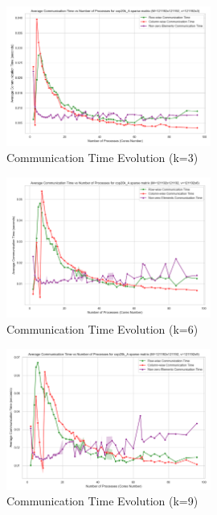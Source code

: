 \documentclass[12pt,oneside]{book} %
\begin{document}
\begin{figure}[H]
    \centering
    \includegraphics[width=0.6\textwidth]{../results/fat_vector_dim/cop20k_A_k3_communication_time.png}
    \caption{Communication Time Evolution (k=3)}\label{fig:cop20k-a-k3-communication-time}
\end{figure}

\begin{figure}[H]
    \centering
    \includegraphics[width=0.6\textwidth]{../results/fat_vector_dim/cop20k_A_k6_communication_time.png}
    \caption{Communication Time Evolution (k=6)}\label{fig:cop20k-a-k6-communication-time}
\end{figure}

\begin{figure}[H]
    \centering
    \includegraphics[width=0.6\textwidth]{../results/fat_vector_dim/cop20k_A_k9_communication_time.png}
    \caption{Communication Time Evolution (k=9)}\label{fig:cop20k-a-k9-communication-time}
\end{figure}
\end{document}
